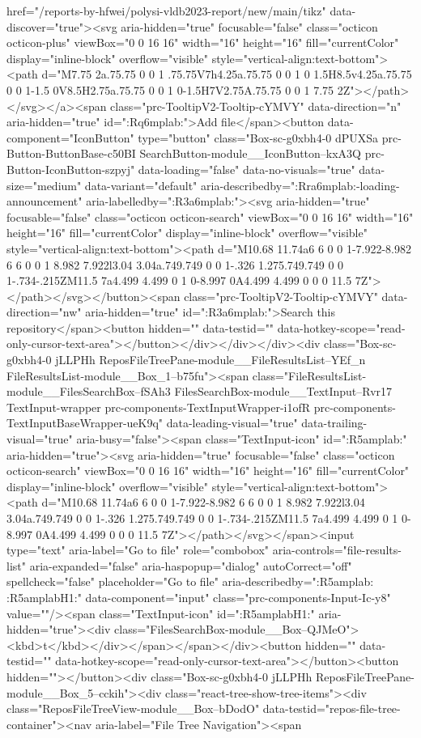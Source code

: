 {{{{{{{{{{{{{{{{{{{{{{{{{{{{{href="/reports-by-hfwei/polysi-vldb2023-report/new/main/tikz" data-discover="true"><svg aria-hidden="true" focusable="false" class="octicon octicon-plus" viewBox="0 0 16 16" width="16" height="16" fill="currentColor" display="inline-block" overflow="visible" style="vertical-align:text-bottom"><path d="M7.75 2a.75.75 0 0 1 .75.75V7h4.25a.75.75 0 0 1 0 1.5H8.5v4.25a.75.75 0 0 1-1.5 0V8.5H2.75a.75.75 0 0 1 0-1.5H7V2.75A.75.75 0 0 1 7.75 2Z"></path></svg></a><span class="prc-TooltipV2-Tooltip-cYMVY" data-direction="n" aria-hidden="true" id=":Rq6mplab:">Add file</span><button data-component="IconButton" type="button" class="Box-sc-g0xbh4-0 dPUXSa prc-Button-ButtonBase-c50BI SearchButton-module__IconButton--kxA3Q prc-Button-IconButton-szpyj" data-loading="false" data-no-visuals="true" data-size="medium" data-variant="default" aria-describedby=":Rra6mplab:-loading-announcement" aria-labelledby=":R3a6mplab:"><svg aria-hidden="true" focusable="false" class="octicon octicon-search" viewBox="0 0 16 16" width="16" height="16" fill="currentColor" display="inline-block" overflow="visible" style="vertical-align:text-bottom"><path d="M10.68 11.74a6 6 0 0 1-7.922-8.982 6 6 0 0 1 8.982 7.922l3.04 3.04a.749.749 0 0 1-.326 1.275.749.749 0 0 1-.734-.215ZM11.5 7a4.499 4.499 0 1 0-8.997 0A4.499 4.499 0 0 0 11.5 7Z"></path></svg></button><span class="prc-TooltipV2-Tooltip-cYMVY" data-direction="nw" aria-hidden="true" id=":R3a6mplab:">Search this repository</span><button hidden="" data-testid="" data-hotkey-scope="read-only-cursor-text-area"></button></div></div></div><div class="Box-sc-g0xbh4-0 jLLPHh ReposFileTreePane-module__FileResultsList--YEf_n FileResultsList-module__Box_1--b75fu"><span class="FileResultsList-module__FilesSearchBox--fSAh3 FilesSearchBox-module__TextInput--Rvr17 TextInput-wrapper prc-components-TextInputWrapper-i1ofR prc-components-TextInputBaseWrapper-ueK9q" data-leading-visual="true" data-trailing-visual="true" aria-busy="false"><span class="TextInput-icon" id=":R5amplab:" aria-hidden="true"><svg aria-hidden="true" focusable="false" class="octicon octicon-search" viewBox="0 0 16 16" width="16" height="16" fill="currentColor" display="inline-block" overflow="visible" style="vertical-align:text-bottom"><path d="M10.68 11.74a6 6 0 0 1-7.922-8.982 6 6 0 0 1 8.982 7.922l3.04 3.04a.749.749 0 0 1-.326 1.275.749.749 0 0 1-.734-.215ZM11.5 7a4.499 4.499 0 1 0-8.997 0A4.499 4.499 0 0 0 11.5 7Z"></path></svg></span><input type="text" aria-label="Go to file" role="combobox" aria-controls="file-results-list" aria-expanded="false" aria-haspopup="dialog" autoCorrect="off" spellcheck="false" placeholder="Go to file" aria-describedby=":R5amplab: :R5amplabH1:" data-component="input" class="prc-components-Input-Ic-y8" value=""/><span class="TextInput-icon" id=":R5amplabH1:" aria-hidden="true"><div class="FilesSearchBox-module__Box--QJMeO"><kbd>t</kbd></div></span></span></div><button hidden="" data-testid="" data-hotkey-scope="read-only-cursor-text-area"></button><button hidden=""></button><div class="Box-sc-g0xbh4-0 jLLPHh ReposFileTreePane-module__Box_5--cckih"><div class="react-tree-show-tree-items"><div class="ReposFileTreeView-module__Box--bDodO" data-testid="repos-file-tree-container"><nav aria-label="File Tree Navigation"><span }}}}}}}}}}}}}}}}}}}}}}}}}}}}}
